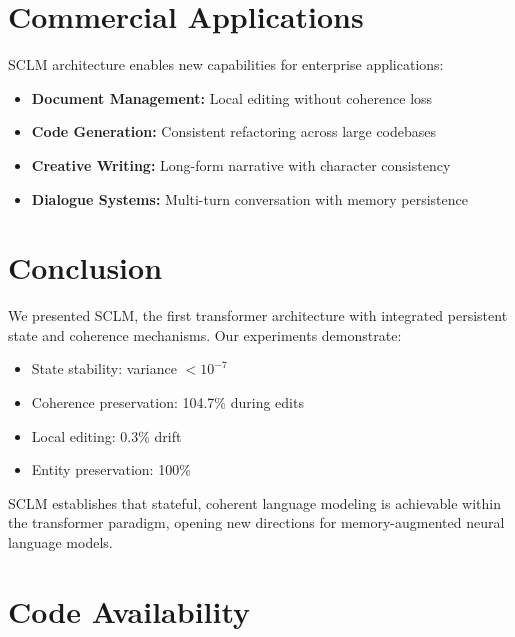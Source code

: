 \documentclass[11pt,a4paper]{article}
\begin{document}
\section{Commercial Applications}

SCLM architecture enables new capabilities for enterprise applications:

\begin{itemize}
    \item \textbf{Document Management:} Local editing without coherence loss
    \item \textbf{Code Generation:} Consistent refactoring across large codebases
    \item \textbf{Creative Writing:} Long-form narrative with character consistency
    \item \textbf{Dialogue Systems:} Multi-turn conversation with memory persistence
\end{itemize}

\section{Conclusion}

We presented SCLM, the first transformer architecture with integrated persistent state and coherence mechanisms. Our experiments demonstrate:

\begin{itemize}
    \item State stability: variance $< 10^{-7}$
    \item Coherence preservation: 104.7\% during edits
    \item Local editing: 0.3\% drift
    \item Entity preservation: 100\%
\end{itemize}

SCLM establishes that stateful, coherent language modeling is achievable within the transformer paradigm, opening new directions for memory-augmented neural language models.

\section*{Code Availability}
\end{document}
